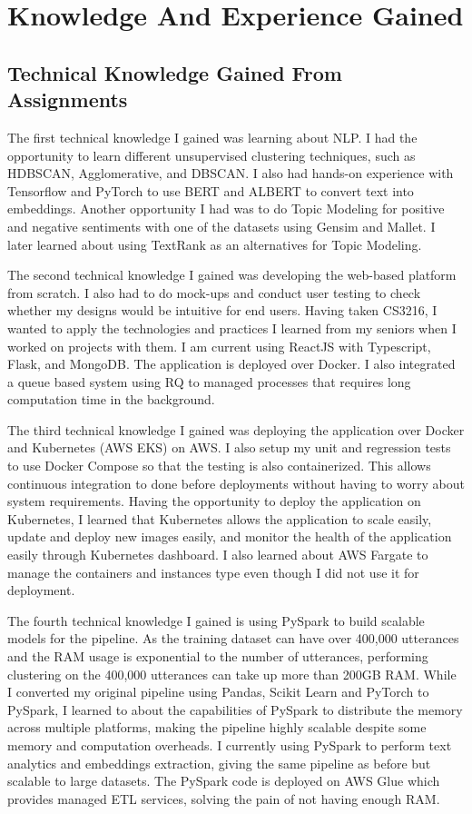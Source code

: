 \section{Knowledge And Experience Gained}
\subsection{Technical Knowledge Gained From Assignments}
\noindent
The first technical knowledge I gained was learning about NLP. I had the opportunity to learn different unsupervised clustering techniques, such as HDBSCAN, Agglomerative, and DBSCAN. I also had hands-on experience with Tensorflow and PyTorch to use BERT and ALBERT to convert text into embeddings. Another opportunity I had was to do Topic Modeling for positive and negative sentiments with one of the datasets using Gensim and Mallet. I later learned about using TextRank as an alternatives for Topic Modeling.

\noindent
The second technical knowledge I gained was developing the web-based platform from scratch. I also had to do mock-ups and conduct user testing to check whether my designs would be intuitive for end users. Having taken CS3216, I wanted to apply the technologies and practices I learned from my seniors when I worked on projects with them. I am current using ReactJS with Typescript, Flask, and MongoDB. The application is deployed over Docker. I also integrated a queue based system using RQ to managed processes that requires long computation time in the background.

\noindent
The third technical knowledge I gained was deploying the application over Docker and Kubernetes (AWS EKS) on AWS. I also setup my unit and regression tests to use Docker Compose so that the testing is also containerized. This allows continuous integration to done before deployments without having to worry about system requirements. Having the opportunity to deploy the application on Kubernetes, I learned that Kubernetes allows the application to scale easily, update and deploy new images easily, and monitor the health of the application easily through Kubernetes dashboard. I also learned about AWS Fargate to manage the containers and instances type even though I did not use it for deployment. 

\noindent
The fourth technical knowledge I gained is using PySpark to build scalable models for the pipeline. As the training dataset can have over 400,000 utterances and the RAM usage is exponential to the number of utterances, performing clustering on the 400,000 utterances can take up more than 200GB RAM. While I converted my original pipeline using Pandas, Scikit Learn and PyTorch to PySpark, I learned to about the capabilities of PySpark to distribute the memory across multiple platforms, making the pipeline highly scalable despite some memory and computation overheads. I currently using PySpark to perform text analytics and embeddings extraction, giving the same pipeline as before but scalable to large datasets. The PySpark code is deployed on AWS Glue which provides managed ETL services, solving the pain of not having enough RAM.

